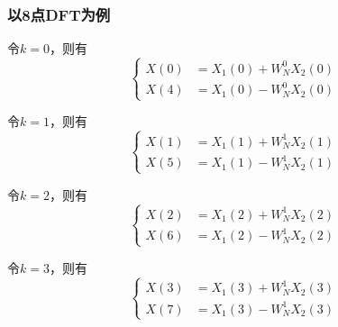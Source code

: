 \documentclass[notheorems,compress,mathserif,table]{beamer}
\begin{document}
\begin{frame}[shrink]\frametitle{以8点DFT为例}
\par 令$k=0$，则有
\begin{equation*} \label{eq:1}
\left\{ \begin{aligned}
         X(0) &= X_{1}(0)+  W_{N}^{0}X_{2}(0)\\
         X(4) &= X_{1}(0)-  W_{N}^{0}X_{2}(0)
\end{aligned} \right.
\end{equation*}
\par 令$k=1$，则有
\begin{equation*} \label{eq:1}
\left\{ \begin{aligned}
         X(1) &= X_{1}(1)+  W_{N}^{1}X_{2}(1)\\
         X(5) &= X_{1}(1)-  W_{N}^{1}X_{2}(1)
\end{aligned} \right.
\end{equation*}
\par 令$k=2$，则有
\begin{equation*} \label{eq:1}
\left\{ \begin{aligned}
         X(2) &= X_{1}(2)+  W_{N}^{1}X_{2}(2)\\
         X(6) &= X_{1}(2)-  W_{N}^{1}X_{2}(2)
\end{aligned} \right.
\end{equation*}
\par 令$k=3$，则有
\begin{equation*} \label{eq:1}
\left\{ \begin{aligned}
         X(3) &= X_{1}(3)+  W_{N}^{1}X_{2}(3)\\
         X(7) &= X_{1}(3)-  W_{N}^{1}X_{2}(3)
\end{aligned} \right.
\end{equation*}
\end{frame}
\end{document}
